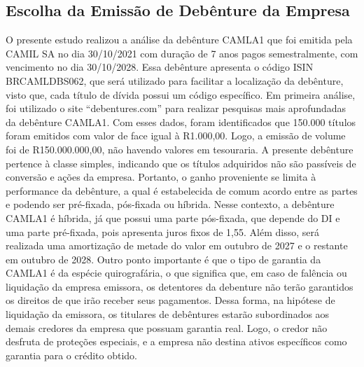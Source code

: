 \documentclass[11pt]{article}
\begin{document}
\subsection{\textbf{Escolha da Emissão de Debênture da Empresa}}
O presente estudo realizou a análise da debênture CAMLA1 que foi emitida pela CAMIL SA no dia 30/10/2021 com duração de 7 anos pagos semestralmente, com vencimento no dia 30/10/2028. Essa debênture apresenta o código ISIN BRCAMLDBS062, que será utilizado para facilitar a localização da debênture, visto que, cada título de dívida possui um código específico.
Em primeira análise, foi utilizado o site “debentures.com”  para realizar pesquisas mais aprofundadas da debênture CAMLA1. Com esses dados, foram identificados que 150.000 títulos foram emitidos com valor de face igual à R1.000,00. Logo, a emissão de volume foi de R150.000.000,00, não havendo valores em tesouraria. A presente debênture pertence à classe simples, indicando que os títulos adquiridos não são passíveis de conversão e ações da empresa. Portanto, o ganho proveniente se limita à performance da debênture, a qual é estabelecida de comum acordo entre as partes e podendo ser pré-fixada, pós-fixada ou híbrida.
Nesse contexto, a debênture CAMLA1 é híbrida, já que possui uma parte pós-fixada, que depende do DI e uma parte pré-fixada, pois apresenta juros fixos de 1,55. Além disso, será realizada uma amortização de metade do valor em outubro de 2027 e o restante em outubro de 2028.  
Outro ponto importante é que o tipo de garantia da CAMLA1 é da espécie quirografária, o que significa que, em caso de falência ou liquidação da empresa emissora, os detentores da debenture não terão garantidos os direitos de que irão receber seus pagamentos. Dessa forma, na hipótese de liquidação da emissora, os titulares de debêntures estarão subordinados aos demais credores da empresa que possuam garantia real. Logo, o credor não desfruta de proteções especiais, e a empresa não destina ativos específicos como garantia para o crédito obtido. 
\end{document}
